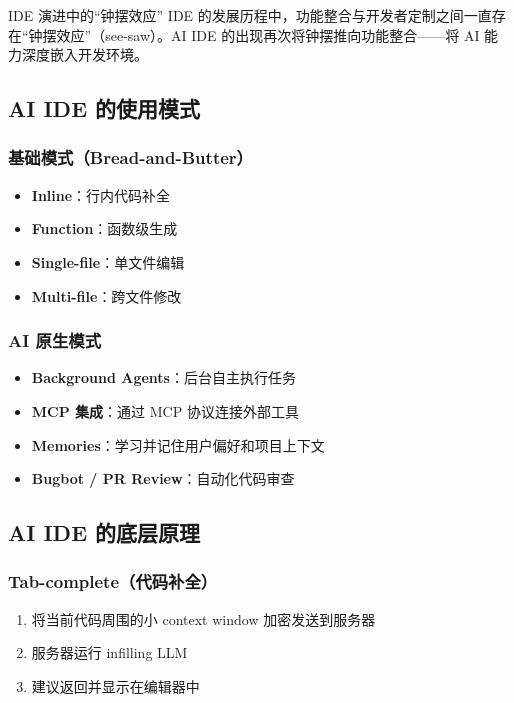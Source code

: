 \documentclass[a4paper]{article}
\begin{document}
\begin{knowledgebox}{IDE 演进中的``钟摆效应''}
IDE 的发展历程中，功能整合与开发者定制之间一直存在``钟摆效应''（see-saw）。AI IDE 的出现再次将钟摆推向功能整合——将 AI 能力深度嵌入开发环境。
\end{knowledgebox}

\subsection{AI IDE 的使用模式}

\subsubsection{基础模式（Bread-and-Butter）}

\begin{itemize}
    \item \textbf{Inline}：行内代码补全
    \item \textbf{Function}：函数级生成
    \item \textbf{Single-file}：单文件编辑
    \item \textbf{Multi-file}：跨文件修改
\end{itemize}

\subsubsection{AI 原生模式}

\begin{itemize}
    \item \textbf{Background Agents}：后台自主执行任务
    \item \textbf{MCP 集成}：通过 MCP 协议连接外部工具
    \item \textbf{Memories}：学习并记住用户偏好和项目上下文
    \item \textbf{Bugbot / PR Review}：自动化代码审查
\end{itemize}

\subsection{AI IDE 的底层原理}

\subsubsection{Tab-complete（代码补全）}

\begin{enumerate}
    \item 将当前代码周围的小 context window 加密发送到服务器
    \item 服务器运行 infilling LLM
    \item 建议返回并显示在编辑器中
\end{enumerate}
\end{document}
